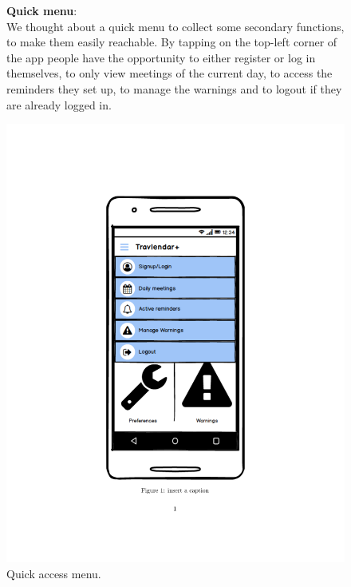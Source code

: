 	\begin{figure}
			\begin{flushleft}
			\textbf{Quick menu}:\\
			We thought about a quick menu to collect some secondary functions, to make them easily reachable. By tapping on the top-left corner of the app people have the opportunity to either register or log in themselves, to only view meetings of the current day, to access the reminders they set up, to manage the warnings and to logout if they are already logged in.
		\end{flushleft}
	\centering
	\includegraphics[width=0.6\linewidth]{mockups/QuickMenu}
	\caption{Quick access menu.}
	\label{fig:quickmenu}
	\end{figure}
\clearpage

